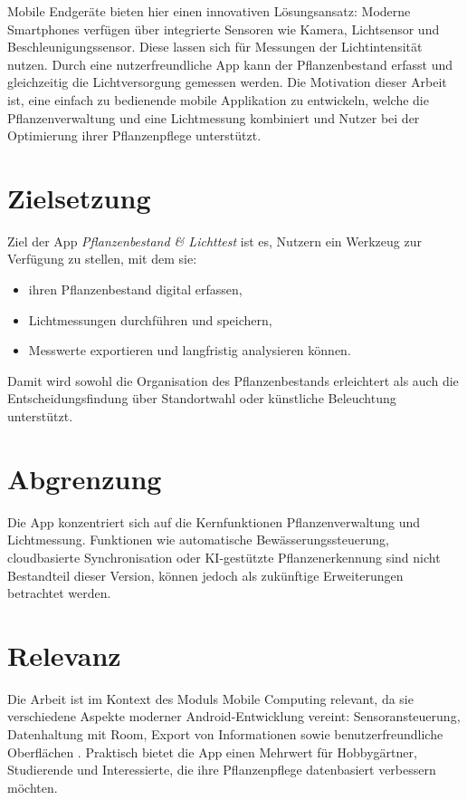 \documentclass[14pt,a4paper]{report}
\begin{document}
Mobile Endgeräte bieten hier einen innovativen Lösungsansatz: Moderne Smartphones verfügen über integrierte Sensoren wie Kamera, Lichtsensor und Beschleunigungssensor. Diese lassen sich für Messungen der Lichtintensität nutzen. Durch eine nutzerfreundliche App kann der Pflanzenbestand erfasst und gleichzeitig die Lichtversorgung gemessen werden. Die Motivation dieser Arbeit ist, eine einfach zu bedienende mobile Applikation zu entwickeln, welche die Pflanzenverwaltung und eine Lichtmessung kombiniert und Nutzer bei der Optimierung ihrer Pflanzenpflege unterstützt.

\section{Zielsetzung}
Ziel der App \textit{Pflanzenbestand \& Lichttest} ist es, Nutzern ein Werkzeug zur Verfügung zu stellen, mit dem sie:
\begin{itemize}
    \item ihren Pflanzenbestand digital erfassen,
    \item Lichtmessungen durchführen und speichern,
    \item Messwerte exportieren und langfristig analysieren können.
\end{itemize}
Damit wird sowohl die Organisation des Pflanzenbestands erleichtert als auch die Entscheidungsfindung über Standortwahl oder künstliche Beleuchtung unterstützt.

\section{Abgrenzung}
Die App konzentriert sich auf die Kernfunktionen Pflanzenverwaltung und Lichtmessung. Funktionen wie automatische Bewässerungssteuerung, cloudbasierte Synchronisation oder KI-gestützte Pflanzenerkennung sind nicht Bestandteil dieser Version, können jedoch als zukünftige Erweiterungen betrachtet werden.

\section{Relevanz}
Die Arbeit ist im Kontext des Moduls Mobile Computing relevant, da sie verschiedene Aspekte moderner Android-Entwicklung vereint: Sensoransteuerung, Datenhaltung mit Room, Export von Informationen sowie benutzerfreundliche Oberflächen \cite{google2024room,google2024workmanager,google2024camerax,google2024material}.
Praktisch bietet die App einen Mehrwert für Hobbygärtner, Studierende und Interessierte, die ihre Pflanzenpflege datenbasiert verbessern möchten.
\end{document}
